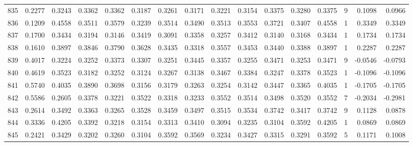 \begin{tabular}{lrrrrrrrrrrrrrrr}
835 &      0.2277 &  0.3243 &  0.3362 &  0.3362 &  0.3187 &  0.3261 &  0.3171 &  0.3221 &  0.3154 &  0.3375 &   0.3280 &     0.3375 &      9 &                    0.1098 &                     0.0966 \\
836 &      0.1209 &  0.4558 &  0.3511 &  0.3579 &  0.3239 &  0.3514 &  0.3490 &  0.3513 &  0.3553 &  0.3721 &   0.3407 &     0.4558 &      1 &                    0.3349 &                     0.3349 \\
837 &      0.1700 &  0.3434 &  0.3194 &  0.3146 &  0.3419 &  0.3091 &  0.3358 &  0.3257 &  0.3412 &  0.3140 &   0.3168 &     0.3434 &      1 &                    0.1734 &                     0.1734 \\
838 &      0.1610 &  0.3897 &  0.3846 &  0.3790 &  0.3628 &  0.3435 &  0.3318 &  0.3557 &  0.3453 &  0.3440 &   0.3388 &     0.3897 &      1 &                    0.2287 &                     0.2287 \\
839 &      0.4017 &  0.3224 &  0.3252 &  0.3373 &  0.3307 &  0.3251 &  0.3445 &  0.3357 &  0.3255 &  0.3471 &   0.3253 &     0.3471 &      9 &                   -0.0546 &                    -0.0793 \\
840 &      0.4619 &  0.3523 &  0.3182 &  0.3252 &  0.3124 &  0.3267 &  0.3138 &  0.3467 &  0.3384 &  0.3247 &   0.3378 &     0.3523 &      1 &                   -0.1096 &                    -0.1096 \\
841 &      0.5740 &  0.4035 &  0.3890 &  0.3698 &  0.3156 &  0.3179 &  0.3263 &  0.3254 &  0.3142 &  0.3447 &   0.3365 &     0.4035 &      1 &                   -0.1705 &                    -0.1705 \\
842 &      0.5586 &  0.2605 &  0.3378 &  0.3221 &  0.3522 &  0.3318 &  0.3233 &  0.3552 &  0.3514 &  0.3498 &   0.3520 &     0.3552 &      7 &                   -0.2034 &                    -0.2981 \\
843 &      0.2614 &  0.3492 &  0.3363 &  0.3265 &  0.3528 &  0.3459 &  0.3497 &  0.3515 &  0.3534 &  0.3742 &   0.3417 &     0.3742 &      9 &                    0.1128 &                     0.0878 \\
844 &      0.3336 &  0.4205 &  0.3392 &  0.3218 &  0.3154 &  0.3313 &  0.3410 &  0.3094 &  0.3235 &  0.3104 &   0.3592 &     0.4205 &      1 &                    0.0869 &                     0.0869 \\
845 &      0.2421 &  0.3429 &  0.3202 &  0.3260 &  0.3104 &  0.3592 &  0.3569 &  0.3234 &  0.3427 &  0.3315 &   0.3291 &     0.3592 &      5 &                    0.1171 &                     0.1008 \\

\end{tabular}
